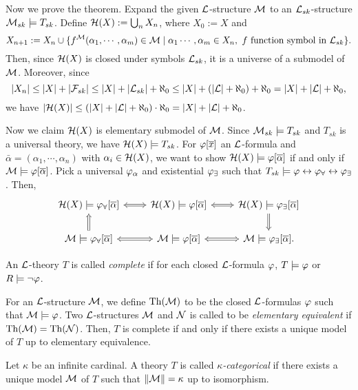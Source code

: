 \documentclass{../../../small}
\DeclareMathOperator{\Th}{Th}
\begin{document}
\begin{pf}
Now we prove the theorem.
Expand the given $\mathcal{L}$-structure $\mathcal{M}$ to an $\mathcal{L}_{sk}$-structure $\mathcal{M}_{sk}\models T_{sk}$.
Define $\mathcal{H}(X):=\bigcup_nX_n$, where $X_0:=X$ and
\[X_{n+1}:=X_n\cup\{f^{\mathcal{M}}(\alpha_1,\cdots,\alpha_m)\in\mathcal{M}\mid\alpha_1\cdots,\alpha_m\in X_n,\text{ $f$ function symbol in $\mathcal{L}_{sk}$}\}.\]
Then, since $\mathcal{H}(X)$ is closed under symbols $\mathcal{L}_{sk}$, it is a universe of a submodel of $\mathcal{M}$.
Moreover, since
\[|X_n|\le|X|+|\mathcal{F}_{sk}|\le|X|+|\mathcal{L}_{sk}|+\aleph_0\le|X|+(|\mathcal{L}|+\aleph_0)+\aleph_0=|X|+|\mathcal{L}|+\aleph_0,\]
we have $|\mathcal{H}(X)|\le(|X|+|\mathcal{L}|+\aleph_0)\cdot\aleph_0=|X|+|\mathcal{L}|+\aleph_0$.

Now we claim $\mathcal{H}(X)$ is elementary submodel of $\mathcal{M}$.
Since $\mathcal{M}_{sk}\models T_{sk}$ and $T_{sk}$ is a universal theory, we have $\mathcal{H}(X)\models T_{sk}$.
For $\varphi[\overline x]$ an $\mathcal{L}$-formula and $\bar\alpha=(\alpha_1,\cdots,\alpha_n)$ with $\alpha_i\in\mathcal{H}(X)$, we want to show $\mathcal{H}(X)\models\varphi[\overline\alpha]$ if and only if $\mathcal{M}\models\varphi[\overline\alpha]$.
Pick a universal $\varphi_\alpha$ and existential $\varphi_\exists$ such that $T_{sk}\models\varphi\leftrightarrow\varphi_\forall\leftrightarrow\varphi_\exists$.
Then,
\[\begin{tikzcd}
\cH(X)\models\f_\forall[\bar\alpha] \ar[Leftrightarrow]{r}
&\cH(X)\models\f[\bar\alpha] \ar[Leftrightarrow]{r}
&\cH(X)\models\f_\exists[\bar\alpha] \ar[Rightarrow]{d}\\
\cM\models\f_\forall[\bar\alpha] \ar[Leftrightarrow]{r}\ar[Rightarrow]{u}
&\cM\models\f[\bar\alpha] \ar[Leftrightarrow]{r}
&\cM\models\f_\exists[\bar\alpha].
\end{tikzcd}\]
\end{pf}

\begin{defn*}
An $\mathcal{L}$-theory $T$ is called \emph{complete} if for each closed $\mathcal{L}$-formula $\varphi$, $T\models\varphi$ or $R\models\neg\varphi$.
\end{defn*}

For an $\mathcal{L}$-structure $\mathcal{M}$, we define $\mathrm{Th}(\mathcal{M})$ to be the closed $\mathcal{L}$-formulas $\varphi$ such that $\mathcal{M}\models\varphi$.
Two $\mathcal{L}$-structures $\mathcal{M}$ and $\mathcal{N}$ is called to be \emph{elementary equivalent} if $\Th(\cM)=\Th(\cN)$.
Then, $T$ is complete if and only if there exists a unique model of $T$ up to elementary equivalence.

\begin{defn*}
Let $\kappa$ be an infinite cardinal.
A theory $T$ is called \emph{$\kappa$-categorical} if there exists a unique model $\mathcal{M}$ of $T$ such that $\|\mathcal{M}\|=\kappa$ up to isomorphism.
\end{defn*}
\end{document}

